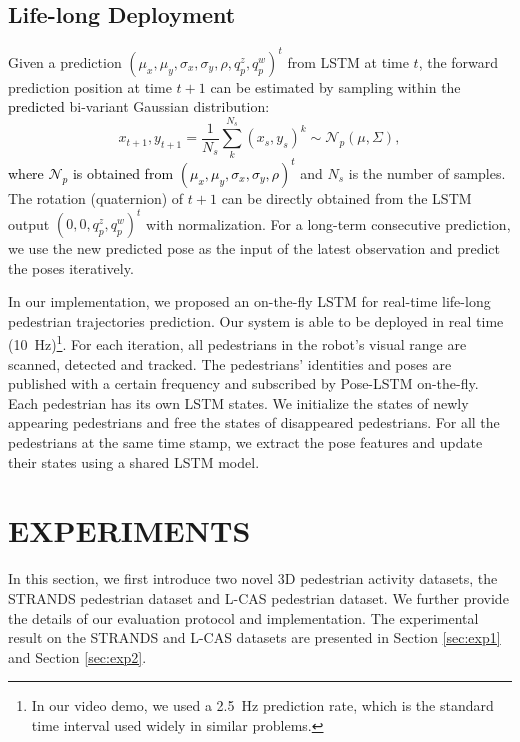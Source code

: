 \documentclass[letterpaper, 10 pt, conference]{ieeeconf}  %
\newcommand\kevinupdate[1]{\textcolor{black}{#1}}
\begin{document}
\subsection{Life-long Deployment}
Given a prediction $(\mu_x, \mu_y, \sigma_x, \sigma_y, \rho, q_p^z, q_p^w)^t$ from LSTM at time $t$, the forward prediction position at time $t+1$ can be estimated by sampling within the \kevinupdate{predicted} bi-variant Gaussian distribution:
\begin{equation}
x_{t+1}, y_{t+1} = \frac{1}{N_{s}} \sum_k^{N_{s}} (x_s, y_s)^k \sim \mathcal{N}_p(\mu, \Sigma),
\end{equation}
\noindent \kevinupdate{where $\mathcal{N}_p$ is obtained from $(\mu_x, \mu_y, \sigma_x, \sigma_y, \rho)^t$  }and $N_s$ is the number of samples. The rotation (quaternion) of $t+1$ can be directly obtained from the LSTM output $(0, 0, q_p^z, q_p^w)^t$ with normalization. For a long-term consecutive prediction, we use the new predicted pose as the input of the latest observation and predict the poses iteratively. 

In our implementation, we proposed an on-the-fly LSTM for real-time life-long pedestrian trajectories prediction. Our system is able to be deployed in real time (10~Hz)\footnote{In our video demo, we used a 2.5~Hz prediction rate, which is the standard time interval used widely in similar problems.}. For each iteration, all pedestrians in the robot's visual range are scanned, detected and tracked. The pedestrians' identities and poses are published with a certain frequency and subscribed by Pose-LSTM on-the-fly. Each pedestrian has its own LSTM states. We initialize the states of newly appearing pedestrians and free the states of disappeared pedestrians. For all the pedestrians at the same time stamp, we extract the pose features and update their states using a shared LSTM model. 

\section{EXPERIMENTS}

\label{sec:experiments}
In this section, we first introduce two novel 3D pedestrian activity datasets, the STRANDS pedestrian dataset and L-CAS pedestrian dataset. We further provide the details of our evaluation protocol and implementation. The experimental result on the STRANDS and L-CAS datasets are presented in Section \ref{sec:exp1} and Section \ref{sec:exp2}.
\end{document}
